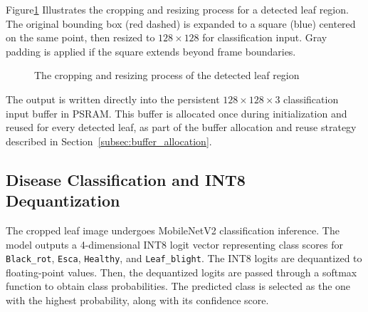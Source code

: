 Figure\ref{fig:crop_resize_example} Illustrates the cropping and resizing process for a detected leaf region. The original bounding box (red dashed) is expanded to a square (blue) centered on the same point, then resized to $128 \times 128$ for classification input. Gray padding is applied if the square extends beyond frame boundaries.
\begin{figure}[htbp]
\centering
{}
\caption{The cropping and resizing process of the detected leaf region}
\label{fig:crop_resize_example}
\end{figure}

The output is written directly into the persistent $128 \times 128 \times 3$ classification input buffer in PSRAM. This buffer is allocated once during initialization and reused for every detected leaf, as part of the buffer allocation and reuse strategy described in Section~\ref{subsec:buffer_allocation}.

\subsection{Disease Classification and INT8 Dequantization}
\label{subsec:classification_dequant}

The cropped leaf image undergoes MobileNetV2 classification inference. The model outputs a 4-dimensional INT8 logit vector representing class scores for \texttt{Black\_rot}, \texttt{Esca}, \texttt{Healthy}, and \texttt{Leaf\_blight}. The INT8 logits are dequantized to floating-point values. Then, the dequantized logits are passed through a softmax function to obtain class probabilities. The predicted class is selected as the one with the highest probability, along with its confidence score.

